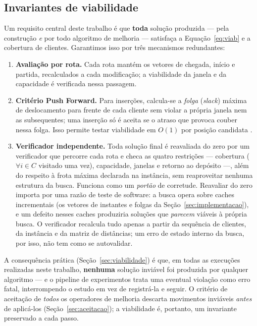 \documentclass[12pt, a4paper]{article}
\begin{document}
\subsection{Invariantes de viabilidade}\label{sec:invariantes}
Um requisito central deste trabalho é que \textbf{toda} solução produzida — pela construção \emph{e} por todo algoritmo de melhoria — satisfaça a Equação~\eqref{eq:viab} e a cobertura de clientes. Garantimos isso por três mecanismos redundantes:
\begin{enumerate}[noitemsep]
\item \textbf{Avaliação por rota.} Cada rota mantém os vetores de chegada, início e partida, recalculados a cada modificação; a viabilidade da janela e da capacidade é verificada nessa passagem.
\item \textbf{Critério Push Forward.} Para inserções, calcula-se a \emph{folga} (\textit{slack}) máxima de deslocamento para frente de cada cliente sem violar a própria janela nem as subsequentes; uma inserção só é aceita se o atraso que provoca couber nessa folga. Isso permite testar viabilidade em $O(1)$ por posição candidata \citep{solomon1987algorithms}.
\item \textbf{Verificador independente.} Toda solução final é reavaliada do zero por um verificador que percorre cada rota e checa as quatro restrições — cobertura ($\forall i\in C$ visitado uma vez), capacidade, janelas e retorno ao depósito —, além do respeito à frota máxima declarada na instância, sem reaproveitar nenhuma estrutura da busca. Funciona como um \emph{portão} de corretude. Reavaliar do zero importa por uma razão de teste de software: a busca opera sobre caches incrementais (os vetores de instantes e folgas da Seção~\ref{sec:implementacao}), e um defeito nesses caches produziria soluções que \emph{parecem} viáveis à própria busca. O verificador recalcula tudo apenas a partir da sequência de clientes, da instância e da matriz de distâncias; um erro de estado interno da busca, por isso, não tem como se autovalidar.
\end{enumerate}
A consequência prática (Seção~\ref{sec:viabilidade}) é que, em todas as execuções realizadas neste trabalho, \textbf{nenhuma} solução inviável foi produzida por qualquer algoritmo --- e o pipeline de experimentos trata uma eventual violação como erro fatal, interrompendo o estudo em vez de registrá-la e seguir. O critério de aceitação de \emph{todos} os operadores de melhoria descarta movimentos inviáveis \emph{antes} de aplicá-los (Seção~\ref{sec:aceitacao}); a viabilidade é, portanto, um invariante preservado a cada passo.
\end{document}
